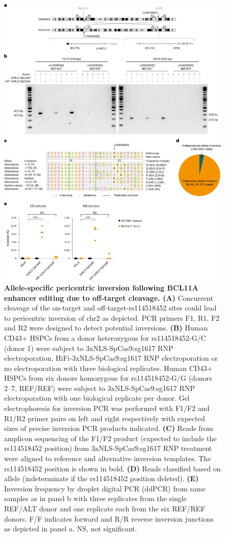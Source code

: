 \documentclass[a4paper, titlepage, openright]{book}
\begin{document}
\begin{figure}
	\centering
	\includegraphics[width=\textwidth]{figures/crisprme7.png}
	\caption[Allele-specific pericentric inversion following BCL11A enhancer editing due to off-target cleavage]{\textbf{Allele-specific pericentric inversion following BCL11A enhancer editing due to off-target cleavage. (A)} Concurrent cleavage of the on-target and off-target-rs114518452 sites could lead to pericentric inversion of chr2 as depicted. PCR primers F1, R1, F2 and R2 were designed to detect potential inversions. \textbf{(B)} Human CD43+ HSPCs from a donor heterozygous for rs114518452-G/C (donor 1) were subject to 3xNLS-SpCas9:sg1617 RNP electroporation, HiFi-3xNLS-SpCas9:sg1617 RNP electroporation or no electroporation with three biological replicates. Human CD43+ HSPCs from six donors homozygous for rs114518452-G/G (donors 2–7, REF/REF) were subject to 3xNLS-SpCas9:sg1617 RNP electroporation with one biological replicate per donor. Gel electrophoresis for inversion PCR was performed with F1/F2 and R1/R2 primer pairs on left and right respectively with expected sizes of precise inversion PCR products indicated. \textbf{(C)} Reads from amplicon sequencing of the F1/F2 product (expected to include the rs114518452 position) from 3xNLS-SpCas9:sg1617 RNP treatment were aligned to reference and alternative inversion templates. The rs114518452 position is shown in bold. \textbf{(D)} Reads classified based on allele (indeterminate if the rs114518452 position deleted). \textbf{(E)} Inversion frequency by droplet digital PCR (ddPCR) from same samples as in panel b with three replicates from the single REF/ALT donor and one replicate each from the six REF/REF donors. F/F indicates forward and R/R reverse inversion junctions as depicted in panel a. NS, not significant.}

\end{figure}
\end{document}
